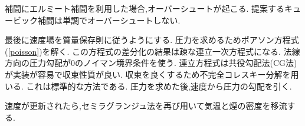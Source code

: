 補間にエルミート補間を利用した場合,オーバーシュートが起こる.
提案するキュービック補間は単調でオーバーシュートしない.

最後に速度場を質量保存則に従うようにする.
圧力を求めるためポアソン方程式(\ref{poisson})を解く.
この方程式の差分化の結果は疎な連立一次方程式になる.
法線方向の圧力勾配が0のノイマン境界条件を使う.
連立方程式は共役勾配法(CG法)が実装が容易で収束性質が良い.
収束を良くするため不完全コレスキー分解を用いる.
これは標準的な方法である.
圧力を求めた後,速度から圧力の勾配を引く.

速度が更新されたら,セミラグランジュ法を再び用いて気温と煙の密度を移流する.

